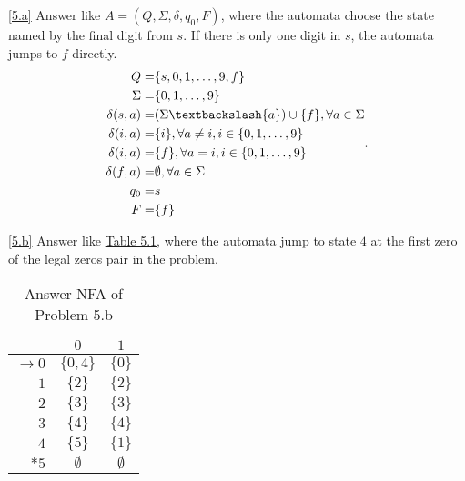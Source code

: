 \documentclass[10pt]{homework}
\begin{document}
\begin{solution}

    \ref{5.a}
    Answer like $A=(Q,\Sigma,\delta,q_0,F)$, where the automata choose the state named by the final digit from $s$. If there is only one digit in $s$, the automata jumps to $f$ directly.
    \[
    \begin{aligned}
        Q=&\{s,0,1,\ldots,9,f\}\\
        \Sigma=& \{0,1,\ldots,9\}\\
        \delta(s,a)=&(\Sigma\textbackslash \{a\})\cup \{f\},\forall a\in\Sigma\\
        \delta(i,a)=&\{i\},\forall a\ne i,i\in \{0,1,\ldots,9\}\\
        \delta(i,a)=&\{f\},\forall a=i,i\in \{0,1,\ldots,9\}\\
        \delta(f,a)=&\emptyset,\forall a\in\Sigma\\
        q_0=&s\\
        F=&\{f\}
    \end{aligned}
    .\] 

    \ref{5.b}
    Answer like \hyperref[tab:problem-5-b]{Table 5.1}, where the automata jump to state $4$ at the first zero of the legal zeros pair in the problem.

      \begin{table}[!h]
        \centering
        \label{tab:problem-5-b}
        \begin{tabular}{r||c|c} %
          & $0$ & $1$\\\hline\hline  %
            $\rightarrow 0$ & $\{0,4\}$ & $\{0\}$\\
            $1$ & $\{2\}$ & $\{2\}$\\
            $2$ & $\{3\}$ & $\{3\}$\\
            $3$ & $\{4\}$ & $\{4\}$\\
            $4$ & $\{5\}$ & $\{1\}$\\
            $*5$& $\emptyset$ & $\emptyset$\\
        \end{tabular}
        \caption{Answer NFA of Problem 5.b}
      \end{table}

\end{solution}
\end{document}
